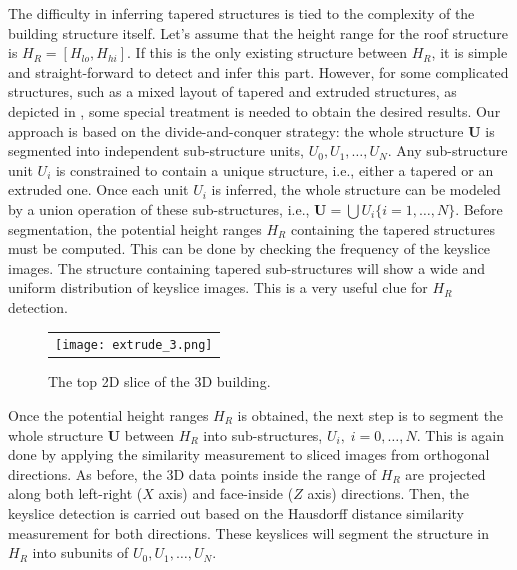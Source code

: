 The difficulty in inferring tapered structures is tied to the complexity of
the building structure itself.
Let's assume that the height range for the roof structure is
$H_R = [H_{lo}, H_{hi}]$.
If this is the only existing structure between $H_R$, it is simple and
straight-forward to detect and infer this part.
However, for some complicated structures, such as a mixed layout
of tapered and extruded structures, as depicted in ,
some special treatment is needed to obtain the desired results.
Our approach is based on the divide-and-conquer strategy:
the whole structure $\boldsymbol{U}$ is segmented into independent
sub-structure units, $U_0, U_1, \ldots, U_N$.
Any sub-structure unit $U_i$ is constrained to contain a unique structure,
i.e., either a tapered or an extruded one.
Once each unit $U_i$ is inferred, the whole structure can be modeled by a
union operation of these sub-structures, i.e.,
$\boldsymbol{U} = \bigcup{U_i\{ i = 1,\ldots,N\}}$.
Before segmentation, the potential height ranges $H_R$ containing the tapered
structures must be computed.
This can be done by checking the frequency of the keyslice images.
The structure containing tapered sub-structures will show a wide and uniform
distribution of keyslice images.
This is a very useful clue for $H_R$ detection.

\begin{figure}[htbp]
\begin{center}
\begin{tabular}{c}
\texttt{[image: extrude\_3.png]} \\
\end{tabular}
\end{center}
\caption{The top 2D slice of the 3D building. }
\label{fig:taper_seg}
\end{figure}

Once the potential height ranges $H_R$ is obtained, the next step is to
segment the whole structure $\boldsymbol{U}$ between $H_R$ into sub-structures,
$U_i, \; i = 0,\ldots,N$.
This is again done by applying the similarity measurement to sliced images
from orthogonal directions.
As before, the 3D data points inside the range of $H_R$ are projected
along both left-right ($X$ axis) and face-inside ($Z$ axis) directions.
Then, the keyslice detection is carried out based on the Hausdorff distance
similarity measurement for both directions.
These keyslices will segment the structure in $H_R$ into subunits of
$U_0, U_1, \ldots, U_N$.

